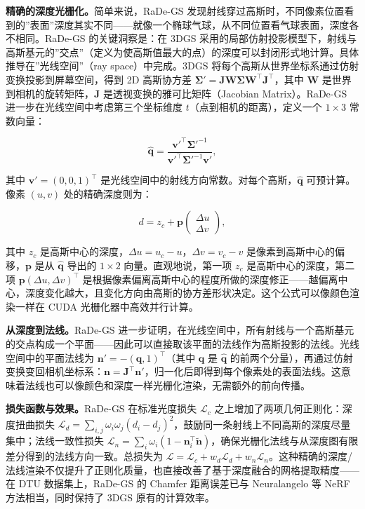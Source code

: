 \textbf{精确的深度光栅化。}简单来说，RaDe-GS 发现射线穿过高斯时，不同像素位置看到的”表面”深度其实不同——就像一个椭球气球，从不同位置看气球表面，深度各不相同。RaDe-GS 的关键洞察是：在 3DGS 采用的局部仿射投影模型下，射线与高斯基元的”交点”（定义为使高斯值最大的点）的深度可以封闭形式地计算。具体推导在”光线空间”（ray space）中完成。3DGS 将每个高斯从世界坐标系通过仿射变换投影到屏幕空间，得到 2D 高斯协方差 $\boldsymbol{\Sigma}' = \mathbf{J}\mathbf{W}\boldsymbol{\Sigma}\mathbf{W}^\top\mathbf{J}^\top$，其中 $\mathbf{W}$ 是世界到相机的旋转矩阵，$\mathbf{J}$ 是透视变换的雅可比矩阵（Jacobian Matrix）。RaDe-GS 进一步在光线空间中考虑第三个坐标维度 $t$（点到相机的距离），定义一个 $1\times 3$ 常数向量：

\begin{equation}
\hat{\mathbf{q}} = \frac{{\mathbf{v}'}^\top \boldsymbol{\Sigma}'^{-1}}{{\mathbf{v}'}^\top \boldsymbol{\Sigma}'^{-1} \mathbf{v}'},
\end{equation}

其中 $\mathbf{v}'=(0,0,1)^\top$ 是光线空间中的射线方向常数。对每个高斯，$\hat{\mathbf{q}}$ 可预计算。像素 $(u,v)$ 处的精确深度则为：

\begin{equation}
d = z_c + \mathbf{p} \begin{pmatrix}\Delta u \\ \Delta v\end{pmatrix},
\end{equation}

其中 $z_c$ 是高斯中心的深度，$\Delta u = u_c - u$，$\Delta v = v_c - v$ 是像素到高斯中心的偏移，$\mathbf{p}$ 是从 $\hat{\mathbf{q}}$ 导出的 $1\times 2$ 向量。直观地说，第一项 $z_c$ 是高斯中心的深度，第二项 $\mathbf{p}(\Delta u, \Delta v)^\top$ 是根据像素偏离高斯中心的程度所做的深度修正——越偏离中心，深度变化越大，且变化方向由高斯的协方差形状决定。这个公式可以像颜色渲染一样在 CUDA 光栅化器中高效并行计算。

\textbf{从深度到法线。}RaDe-GS 进一步证明，在光线空间中，所有射线与一个高斯基元的交点构成一个平面——因此可以直接取该平面的法线作为高斯投影的法线。光线空间中的平面法线为 $\mathbf{n}' = -(\mathbf{q}, 1)^\top$（其中 $\mathbf{q}$ 是 $\hat{\mathbf{q}}$ 的前两个分量），再通过仿射变换变回相机坐标系：$\mathbf{n} = \mathbf{J}^\top \mathbf{n}'$，归一化后即得到每个像素处的表面法线。这意味着法线也可以像颜色和深度一样光栅化渲染，无需额外的前向传播。

\textbf{损失函数与效果。}RaDe-GS 在标准光度损失 $\mathcal{L}_c$ 之上增加了两项几何正则化：深度扭曲损失 $\mathcal{L}_d = \sum_{i,j}\omega_i\omega_j(d_i-d_j)^2$，鼓励同一条射线上不同高斯的深度尽量集中；法线一致性损失 $\mathcal{L}_n = \sum_i \omega_i(1-\mathbf{n}_i^\top \tilde{\mathbf{n}})$，确保光栅化法线与从深度图有限差分得到的法线方向一致。总损失为 $\mathcal{L} = \mathcal{L}_c + w_d \mathcal{L}_d + w_n \mathcal{L}_n$。这种精确的深度/法线渲染不仅提升了正则化质量，也直接改善了基于深度融合的网格提取精度——在 DTU 数据集上，RaDe-GS 的 Chamfer 距离误差已与 Neuralangelo 等 NeRF 方法相当，同时保持了 3DGS 原有的计算效率。

